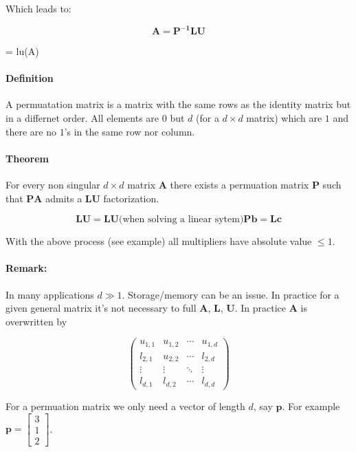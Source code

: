 Which leads to:

\[
	\mathbf{A} = \mathbf{P^{-1}LU}
\]

\begin{Matlab}
	[L, U, P] = lu(A)
\end{Matlab}

\paragraph{Definition} A permuatation matrix is a matrix with the same rows as
the identity matrix but in a differnet order. All elements are $0$ but $d$ (for
a $d \times d$ matrix) which are $1$ and there are no $1$'s in the same row nor
column.

\paragraph{Theorem} For every non singular $d \times d$ matrix $\mathbf{A}$ there
exists a permuation matrix $\mathbf{P}$ such that $\mathbf{PA}$ admits a 
$\mathbf{LU}$ factorization.

\[
	\mathbf{LU} = \mathbf{LU} \text{(when solving a linear sytem} \text{)}
	 	\mathbf{Pb} = \mathbf{Lc}
\]

With the above process (see example) all multipliers have absolute value $\leq 1$.

\paragraph{Remark:} In many applications $d \gg 1$. Storage/memory can be an
issue. In practice for a given general matrix it's not necessary to full
$\mathbf{A}$, $\mathbf{L}$, $\mathbf{U}$. In practice $\mathbf{A}$ is overwritten
by

\[
	\begin{pmatrix}
		u_{1,1} & u_{1,2} & \cdots & u_{1,d} \\
		l_{2,1} & u_{2,2} & \cdots & l_{2,d} \\
		\vdots  & \vdots  & \ddots & \vdots  \\
		l_{d,1} & l_{d,2} & \cdots & l_{d,d}
	\end{pmatrix}
\]

For a permuation matrix we only need a vector of length $d$, say $\mathbf{p}$.
For example $\mathbf{p} = \begin{bmatrix}3 \\ 1 \\ 2\end{bmatrix}$.

